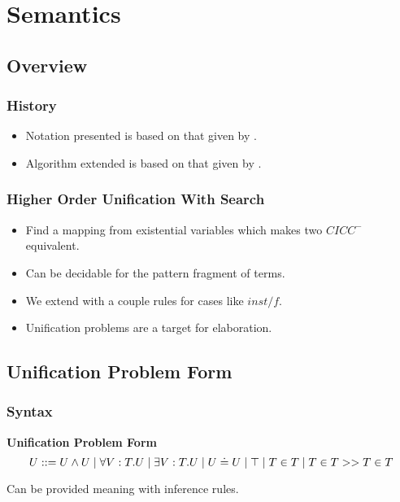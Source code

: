 \section{Semantics}

\subsection{Overview}

\begin{frame}
\frametitle{History}
\begin{itemize}
\item Notation presented is based on that given by \citet{pfenning1991logic}.
\item Algorithm extended is based on that given by \citep{pfenning1991unification}.
\end{itemize}
\end{frame}



\begin{frame}
\frametitle{Higher Order Unification With Search}
\begin{itemize}
\item Find a mapping from existential variables which makes two $CICC^-$ equivalent.
\item Can be decidable for the pattern fragment of terms.
\item We extend with a couple rules for cases like $inst/f$.
\item Unification problems are a target for elaboration.
\end{itemize}
\end{frame}



\subsection[$UPF$]{Unification Problem Form}

\begin{frame}
\frametitle{Syntax}
\begin{definition}
\textbf{Unification Problem Form}
\[
U ::= U \wedge U 
 \; | \; \forall V : T . U
 \; | \; \exists V : T . U 
 \; | \; U \doteq U
 \; | \; \top
  \; | \; T \in T 
  \; | \; T \in T >> T \in T
\]

\end{definition}

Can be provided meaning with inference rules.

\end{frame}



